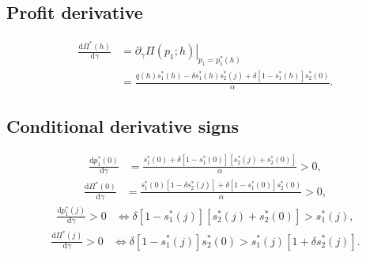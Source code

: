 \documentclass[11pt]{article}
\newcommand{\dd}{\mathrm{d}}
\begin{document}
\subsection{Profit derivative}
\begin{equation}
\begin{aligned}
\frac{\dd\Pi^*(h)}{\dd\gamma}
&=\left.\partial_\gamma\Pi(p_1;h)\right|_{p_1=p_1^*(h)}\\[3pt]
&=\frac{q(h)s_1^*(h)-\delta s_1^*(h)s_2^*(j)
 +\delta[1-s_1^*(h)]s_2^*(0)}{\alpha}.
\end{aligned}
\end{equation}

\subsection{Conditional derivative signs}
\begin{equation}
\begin{aligned}
\frac{\dd p_1^*(0)}{\dd\gamma}
&=\frac{s_1^*(0)+\delta[1-s_1^*(0)][s_2^*(j)+s_2^*(0)]}{\alpha}>0,
\end{aligned}
\end{equation}
\begin{equation}
\begin{aligned}
\frac{\dd\Pi^*(0)}{\dd\gamma}
&=\frac{s_1^*(0)[1-\delta s_2^*(j)]+\delta[1-s_1^*(0)]s_2^*(0)}{\alpha}>0,
\end{aligned}
\end{equation}
\begin{equation}
\begin{aligned}
\frac{\dd p_1^*(j)}{\dd\gamma}>0
&\iff\delta[1-s_1^*(j)][s_2^*(j)+s_2^*(0)]>s_1^*(j),
\end{aligned}
\end{equation}
\begin{equation}
\begin{aligned}
\frac{\dd\Pi^*(j)}{\dd\gamma}>0
&\iff\delta[1-s_1^*(j)]s_2^*(0)>s_1^*(j)[1+\delta s_2^*(j)].
\end{aligned}
\end{equation}
\end{document}
